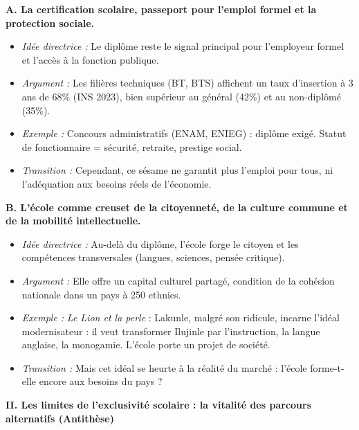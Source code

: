 \documentclass[11pt]{article}
\begin{document}
\begin{exoresolu}
\noindent\textbf{A. La certification scolaire, passeport pour l'emploi formel et la protection sociale.}
\begin{itemize}
    \item \textit{Idée directrice :} Le diplôme reste le signal principal pour l'employeur formel et l'accès à la fonction publique.
    \item \textit{Argument :} Les filières techniques (BT, BTS) affichent un taux d'insertion à 3 ans de 68\% (INS 2023), bien supérieur au général (42\%) et au non-diplômé (35\%).
    \item \textit{Exemple :} Concours administratifs (ENAM, ENIEG) : diplôme exigé. Statut de fonctionnaire = sécurité, retraite, prestige social.
    \item \textit{Transition :} Cependant, ce sésame ne garantit plus l'emploi pour tous, ni l'adéquation aux besoins réels de l'économie.
\end{itemize}

\noindent\textbf{B. L'école comme creuset de la citoyenneté, de la culture commune et de la mobilité intellectuelle.}
\begin{itemize}
    \item \textit{Idée directrice :} Au-delà du diplôme, l'école forge le citoyen et les compétences transversales (langues, sciences, pensée critique).
    \item \textit{Argument :} Elle offre un capital culturel partagé, condition de la cohésion nationale dans un pays à 250 ethnies.
    \item \textit{Exemple :} \emph{Le Lion et la perle} : Lakunle, malgré son ridicule, incarne l'idéal modernisateur : il veut transformer Ilujinle par l'instruction, la langue anglaise, la monogamie. L'école porte un projet de société.
    \item \textit{Transition :} Mais cet idéal se heurte à la réalité du marché : l'école forme-t-elle encore aux besoins du pays ?
\end{itemize}

\noindent\textbf{II. Les limites de l'exclusivité scolaire : la vitalité des parcours alternatifs (Antithèse)}


\end{exoresolu}
\end{document}
